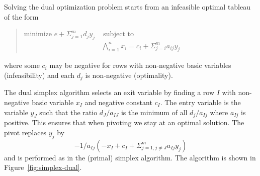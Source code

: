 \documentclass{article}
\begin{document}
Solving the dual optimization problem starts from
an infeasible optimal tableau of the form
\begin{quote}\vspace*{-1ex}
minimize $e + \Sigma_{j=1}^m d_j y_j$ 
~ subject to
$$
\begin{array}{rcl}
\bigwedge_{i=1}^{n} x_i = c_i + \Sigma_{j=i}^m a_{ij} y_j
\end{array}$$
\end{quote}\vspace{-0.9ex}
where some $c_i$ may be negative 
for rows with non-negative basic variables (infeasibility) 
and each $d_j$ is non-negative (optimality).

The dual simplex algorithm selects an exit variable
by finding a row $I$ with non-negative basic variable
$x_I$ and negative constant $c_I$\@.  
The entry variable is the variable $y_J$
such that
the ratio $d_J/a_{IJ}$ is the minimum of all $d_j/a_{Ij}$
where $a_{Ij}$ is positive. This ensures that when pivoting we stay at an
optimal solution.
The pivot replaces $y_j$ by
$$-1/a_{Ij} (-x_I + c_I + \Sigma_{j=1, j\neq J }^m a_{Ij} y_j)$$
and is performed as in the (primal) simplex algorithm.
The algorithm is shown in Figure~\ref{fig:simplex-dual}.
\end{document}
